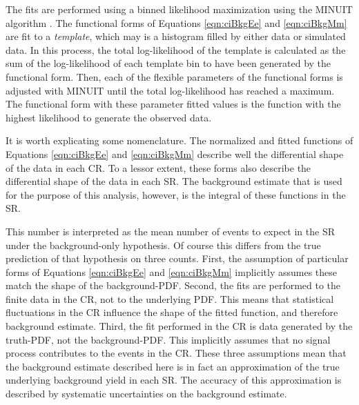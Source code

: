 The fits are performed using a binned likelihood maximization using the MINUIT algorithm \cite{minuit}.
The functional forms of Equations \ref{eqn:ciBkgEe} and \ref{eqn:ciBkgMm} are fit to a \emph{template}, which may is a histogram filled by either data or simulated data.
In this process, the total log-likelihood of the template is calculated as the sum of the log-likelihood of each template bin to have been generated by the functional form.
Then, each of the flexible parameters of the functional forms is adjusted with MINUIT until the total log-likelihood has reached a maximum.
The functional form with these parameter fitted values is the function with the highest likelihood to generate the observed data.

It is worth explicating some nomenclature. 
The normalized and fitted functions of Equations \ref{eqn:ciBkgEe} and \ref{eqn:ciBkgMm} describe well the differential shape of the data in each CR.
To a lessor extent, these forms also describe the differential shape of the data in each SR.
The background estimate that is used for the purpose of this analysis, however, is the integral of these functions in the SR.

This number is interpreted as the mean number of events to expect in the SR under the background-only hypothesis.
Of course this differs from the true prediction of that hypothesis on three counts.
First, the assumption of particular forms of Equations \ref{eqn:ciBkgEe} and \ref{eqn:ciBkgMm} implicitly assumes these match the shape of the background-PDF.
Second, the fits are performed to the finite data in the CR, not to the underlying PDF.
This means that statistical fluctuations in the CR influence the shape of the fitted function, and therefore background estimate.
Third, the fit performed in the CR is data generated by the truth-PDF, not the background-PDF. 
This implicitly assumes that no signal process contributes to the events in the CR. 
These three assumptions mean that the background estimate described here is in fact an approximation of the true underlying background yield in each SR.
The accuracy of this approximation is described by systematic uncertainties on the background estimate.
